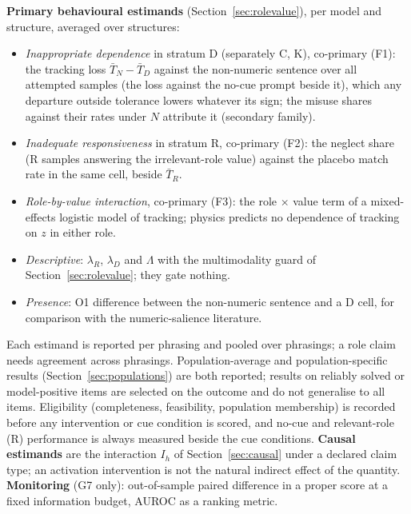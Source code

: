 \documentclass[10pt,a4paper]{article}
\begin{document}
\textbf{Primary behavioural estimands} (Section~\ref{sec:rolevalue}), per model and structure, averaged over
structures:
\begin{itemize}
\item \emph{Inappropriate dependence} in stratum D (separately C, K), co-primary (F1): the tracking loss
$\bar T_N-\bar T_D$ against the non-numeric sentence over all attempted samples (the loss against the no-cue prompt
beside it), which any departure outside tolerance lowers whatever its sign; the misuse shares against their rates
under $N$ attribute it (secondary family).
\item \emph{Inadequate responsiveness} in stratum R, co-primary (F2): the neglect share (R samples answering the
irrelevant-role value) against the placebo match rate in the same cell, beside $\bar T_R$.
\item \emph{Role-by-value interaction}, co-primary (F3): the role $\times$ value term of a mixed-effects logistic
model of tracking; physics predicts no dependence of tracking on $z$ in either role.
\item \emph{Descriptive}: $\lambda_R$, $\lambda_D$ and $\Lambda$ with the multimodality guard of
Section~\ref{sec:rolevalue}; they gate nothing.
\item \emph{Presence}: O1 difference between the non-numeric sentence and a D cell, for comparison with the
numeric-salience literature.
\end{itemize}
Each estimand is reported per phrasing and pooled over phrasings; a role claim needs agreement across phrasings.
Population-average and population-specific results (Section~\ref{sec:populations}) are both reported; results on
reliably solved or model-positive items are selected on the outcome and do not generalise to all items.
Eligibility (completeness, feasibility, population membership) is recorded before any intervention or cue
condition is scored, and no-cue and relevant-role (R) performance is always measured beside the cue conditions.
\textbf{Causal estimands} are the interaction $I_h$ of Section~\ref{sec:causal} under a declared claim type; an
activation intervention is not the natural indirect effect of the quantity. \textbf{Monitoring} (G7 only):
out-of-sample paired difference in a proper score at a fixed information budget, AUROC as a ranking metric.
\end{document}
